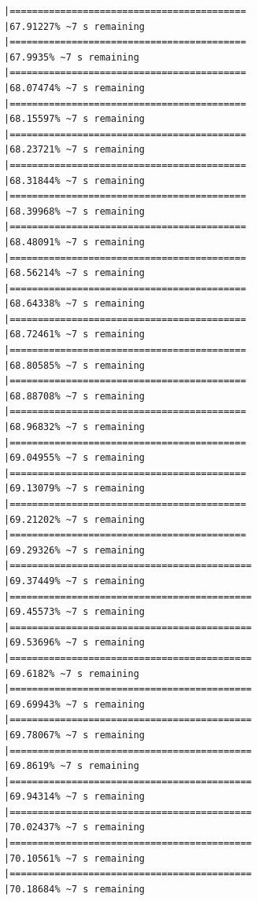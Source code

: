 \documentclass{article}\usepackage[]{graphicx}\usepackage[]{xcolor}
\makeatletter
\newenvironment{kframe}{%
 \def\at@end@of@kframe{}%
 \ifinner\ifhmode%
  \def\at@end@of@kframe{\end{minipage}}%
  \begin{minipage}{\columnwidth}%
 \fi\fi%
 \def\FrameCommand##1{\hskip\@totalleftmargin \hskip-\fboxsep
 \colorbox{shadecolor}{##1}\hskip-\fboxsep
     \hskip-\linewidth \hskip-\@totalleftmargin \hskip\columnwidth}%
 \MakeFramed {\advance\hsize-\width
   \@totalleftmargin\z@ \linewidth\hsize
   \@setminipage}}%
 {\par\unskip\endMakeFramed%
 \at@end@of@kframe}
\newenvironment{knitrout}{}{} %
\makeatother
\begin{document}
\begin{knitrout}
\begin{kframe}
\begin{verbatim}
|==========================================                    |67.91227% ~7 s remaining  
|==========================================                    |67.9935% ~7 s remaining   
|==========================================                    |68.07474% ~7 s remaining  
|==========================================                    |68.15597% ~7 s remaining  
|==========================================                    |68.23721% ~7 s remaining  
|==========================================                    |68.31844% ~7 s remaining  
|==========================================                    |68.39968% ~7 s remaining  
|==========================================                    |68.48091% ~7 s remaining  
|==========================================                    |68.56214% ~7 s remaining  
|==========================================                    |68.64338% ~7 s remaining  
|==========================================                    |68.72461% ~7 s remaining  
|==========================================                    |68.80585% ~7 s remaining  
|==========================================                    |68.88708% ~7 s remaining  
|==========================================                    |68.96832% ~7 s remaining  
|==========================================                    |69.04955% ~7 s remaining  
|==========================================                    |69.13079% ~7 s remaining  
|==========================================                    |69.21202% ~7 s remaining  
|==========================================                    |69.29326% ~7 s remaining  
|===========================================                   |69.37449% ~7 s remaining  
|===========================================                   |69.45573% ~7 s remaining  
|===========================================                   |69.53696% ~7 s remaining  
|===========================================                   |69.6182% ~7 s remaining   
|===========================================                   |69.69943% ~7 s remaining  
|===========================================                   |69.78067% ~7 s remaining  
|===========================================                   |69.8619% ~7 s remaining   
|===========================================                   |69.94314% ~7 s remaining  
|===========================================                   |70.02437% ~7 s remaining  
|===========================================                   |70.10561% ~7 s remaining  
|===========================================                   |70.18684% ~7 s remaining  

\end{verbatim}
\end{kframe}
\end{knitrout}
\end{document}

